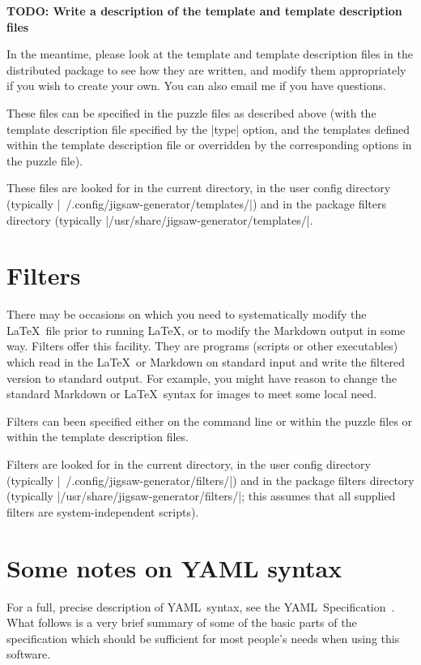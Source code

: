 \documentclass{article}
\def\YAML{{\small YAML}}
\begin{document}
\textbf{TODO: Write a description of the template and template
  description files}

In the meantime, please look at the template and template description
files in the distributed package to see how they are written, and
modify them appropriately if you wish to create your own.  You can
also email me if you have questions.

These files can be specified in the puzzle files as described above
(with the template description file specified by the |type| option,
and the templates defined within the template description file or
overridden by the corresponding options in the puzzle file). 

These files are looked for in the current directory, in the user config
directory (typically |~/.config/jigsaw-generator/templates/|) and in the
package filters directory (typically
|/usr/share/jigsaw-generator/templates/|.

\section{Filters}
\label{sec:filters}

There may be occasions on which you need to systematically modify the
\LaTeX\ file prior to running \LaTeX, or to modify the Markdown output
in some way.  Filters offer this facility.  They are programs (scripts
or other executables) which read in the \LaTeX\ or Markdown on
standard input and write the filtered version to standard output.  For
example, you might have reason to change the standard Markdown or
\LaTeX\ syntax for images to meet some local need.

Filters can been specified either on the command line or within the
puzzle files or within the template description files.

Filters are looked for in the current directory, in the user config
directory (typically |~/.config/jigsaw-generator/filters/|) and in the
package filters directory (typically
|/usr/share/jigsaw-generator/filters/|; this assumes that all supplied
filters are system-independent scripts).

\section{Some notes on \texorpdfstring{\YAML}{YAML} syntax}

For a full, precise description of \YAML\ syntax, see the \YAML\
Specification~\cite{YAML}.  What follows is a very brief summary of
some of the basic parts of the specification which should be
sufficient for most people's needs when using this software.
\end{document}

